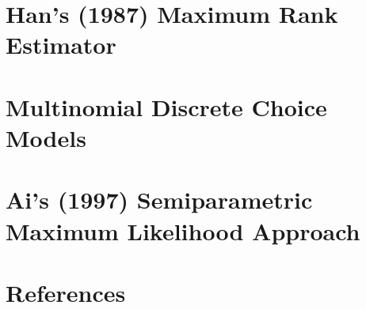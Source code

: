 \documentclass[xcolor=svgnames,dvipdfmx,cjk]{beamer}
\theoremstyle{example}
\begin{document}
  
  
  
  
  
  
  
  
  
  
  \section{Han's (1987) Maximum Rank Estimator}
  
  
  
  
  
  
  
  
  
  
  \section{Multinomial Discrete Choice Models}
  
  
  
  
  
  
  
  
  
  \section{Ai's (1997) Semiparametric Maximum Likelihood Approach}
  
  
  
  
  
  
  
  
  
  
  \section{References}
  
\end{document}
